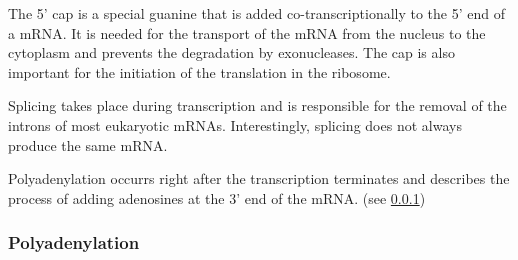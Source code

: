 The 5' cap is a special guanine that is added co-transcriptionally to the 5' end of a mRNA. It is needed for the transport of the mRNA from the nucleus to the cytoplasm and prevents the degradation by exonucleases. The cap is also important for the initiation of the translation in the ribosome. 

Splicing takes place during transcription and is responsible for the removal of the introns of most eukaryotic mRNAs. Interestingly, splicing does not always produce the same mRNA.

Polyadenylation occurrs right after the transcription terminates and describes the process of adding adenosines at the 3' end of the mRNA. (see \ref{polyadenylation})

\subsubsection{Polyadenylation}
\label{polyadenylation}
